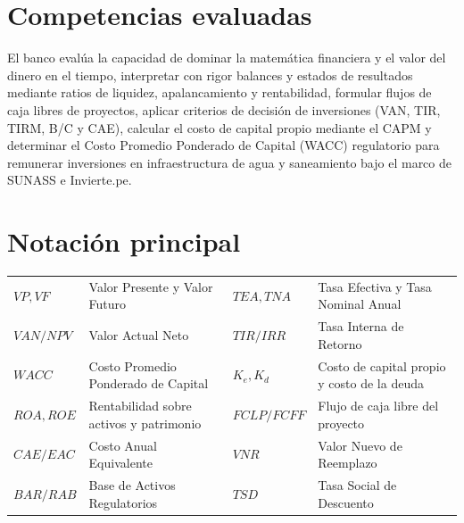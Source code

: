 \documentclass[11pt,a4paper]{article}
\newcounter{qnum}
\begin{document}
\section*{Competencias evaluadas}

\noindent El banco evalúa la capacidad de dominar la matemática financiera y el valor del dinero en el tiempo, interpretar con rigor balances y estados de resultados mediante ratios de liquidez, apalancamiento y rentabilidad, formular flujos de caja libres de proyectos, aplicar criterios de decisión de inversiones (VAN, TIR, TIRM, B/C y CAE), calcular el costo de capital propio mediante el CAPM y determinar el Costo Promedio Ponderado de Capital (WACC) regulatorio para remunerar inversiones en infraestructura de agua y saneamiento bajo el marco de SUNASS e Invierte.pe.

\section*{Notación principal}

{\small
\renewcommand{\arraystretch}{1.0}
\begin{center}
\begin{tabular}{@{}ll@{\hspace{1.0cm}}ll@{}}
\toprule
$VP, VF$ & Valor Presente y Valor Futuro & $TEA, TNA$ & Tasa Efectiva y Tasa Nominal Anual \\
$VAN / NPV$ & Valor Actual Neto & $TIR / IRR$ & Tasa Interna de Retorno \\
$WACC$ & Costo Promedio Ponderado de Capital & $K_e, K_d$ & Costo de capital propio y costo de la deuda \\
$ROA, ROE$ & Rentabilidad sobre activos y patrimonio & $FCLP / FCFF$ & Flujo de caja libre del proyecto \\
$CAE / EAC$ & Costo Anual Equivalente & $VNR$ & Valor Nuevo de Reemplazo \\
$BAR / RAB$ & Base de Activos Regulatorios & $TSD$ & Tasa Social de Descuento \\
\bottomrule
\end{tabular}
\end{center}
}

\newpage
\setcounter{qnum}{0}







\end{document}
